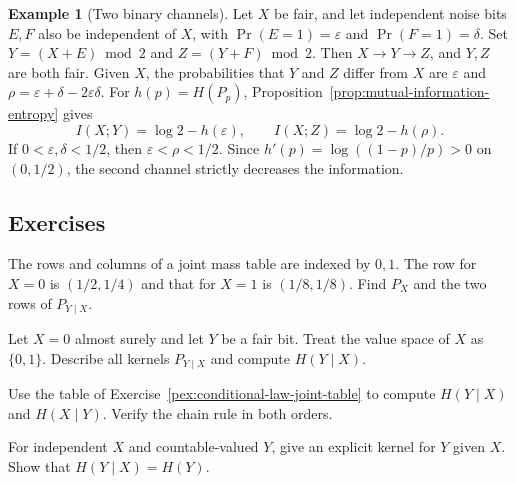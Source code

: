 \documentclass[11pt,oneside]{book}
\theoremstyle{definition}
\newtheorem{example}[theorem]{Example}
\theoremstyle{remark}
\begin{document}
\begin{example}[Two binary channels]
\label{ex:mutual-information-binary-channels}
Let $X$ be fair, and let independent noise bits $E,F$ also be
independent of $X$, with $\Pr(E=1)=\varepsilon$ and
$\Pr(F=1)=\delta$. Set $Y=(X+E)\bmod2$ and $Z=(Y+F)\bmod2$.
Then $X\to Y\to Z$, and $Y,Z$ are both fair. Given $X$, the
probabilities that $Y$ and $Z$ differ from $X$ are
$\varepsilon$ and $\rho=\varepsilon+\delta-2\varepsilon\delta$.
For $h(p)=H(P_p)$, Proposition~\ref{prop:mutual-information-entropy}
gives
\[
I(X;Y)=\log 2-h(\varepsilon),\qquad I(X;Z)=\log 2-h(\rho).
\]
If $0<\varepsilon,\delta<1/2$, then
$\varepsilon<\rho<1/2$. Since $h'(p)=\log((1-p)/p)>0$ on
$(0,1/2)$, the second channel strictly decreases the information.
\end{example}

\subsection{Exercises}
\label{subsec:practice-3-3}

\begin{practiceexercise}
\label{pex:conditional-law-joint-table}
The rows and columns of a joint mass table are indexed by $0,1$.
The row for $X=0$ is $(1/2,1/4)$ and that for $X=1$ is $(1/8,1/8)$.
Find $P_X$ and the two rows of $P_{Y\mid X}$.
\end{practiceexercise}

\begin{practiceexercise}
\label{pex:conditional-law-null-row}
Let $X=0$ almost surely and let $Y$ be a fair bit. Treat the
value space of $X$ as $\{0,1\}$. Describe all kernels
$P_{Y\mid X}$ and compute $H(Y\mid X)$.
\end{practiceexercise}

\begin{practiceexercise}
\label{pex:conditional-entropy-both-orders}
Use the table of Exercise~\ref{pex:conditional-law-joint-table}
to compute $H(Y\mid X)$ and $H(X\mid Y)$. Verify the chain rule in
both orders.
\end{practiceexercise}

\begin{practiceexercise}
\label{pex:conditional-entropy-independent}
For independent $X$ and countable-valued $Y$, give an explicit
kernel for $Y$ given $X$. Show that $H(Y\mid X)=H(Y)$.
\end{practiceexercise}
\end{document}
